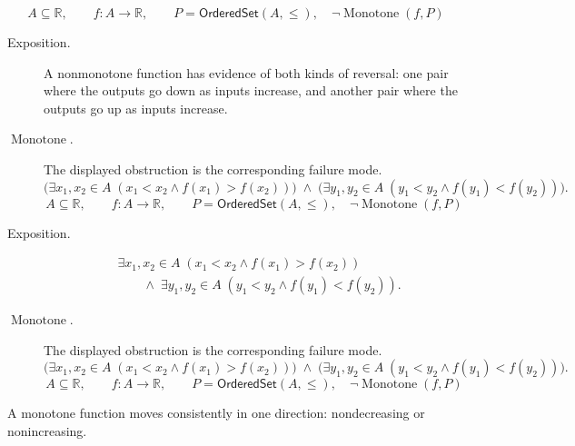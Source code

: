 \begin{remark*}
\[
  A\subseteq\mathbb{R},\qquad f\colon A\to\mathbb{R},\qquad P=\mathsf{OrderedSet}(A,\leq),\quad
  \neg\operatorname{Monotone}(f,P)
\]
\end{remark*}

\begin{remark*}
\begin{description}
  \item[Exposition.]
A nonmonotone function has evidence of both kinds of reversal: one pair
where the outputs go down as inputs increase, and another pair where the
outputs go up as inputs increase.


  \item[\(\operatorname{Monotone}.\)]
  The displayed obstruction is the corresponding failure mode.
  \[
  \bigl(\exists x_1,x_2\in A\;(x_1<x_2\wedge f(x_1)>f(x_2))\bigr)
  \;\wedge\;
  \bigl(\exists y_1,y_2\in A\;(y_1<y_2\wedge f(y_1)<f(y_2))\bigr).
\]
  \[
  A\subseteq\mathbb{R},\qquad f\colon A\to\mathbb{R},\qquad P=\mathsf{OrderedSet}(A,\leq),\quad
  \neg\operatorname{Monotone}(f,P)
\]
\end{description}
\end{remark*}

\begin{remark*}
\begin{description}
  \item[Exposition.]
\[
  \begin{aligned}
  &\exists x_1,x_2\in A\;(x_1<x_2\wedge f(x_1)>f(x_2))\\
  &\qquad\wedge\;
  \exists y_1,y_2\in A\;(y_1<y_2\wedge f(y_1)<f(y_2)).
  \end{aligned}
\]


  \item[\(\operatorname{Monotone}.\)]
  The displayed obstruction is the corresponding failure mode.
  \[
  \bigl(\exists x_1,x_2\in A\;(x_1<x_2\wedge f(x_1)>f(x_2))\bigr)
  \;\wedge\;
  \bigl(\exists y_1,y_2\in A\;(y_1<y_2\wedge f(y_1)<f(y_2))\bigr).
\]
  \[
  A\subseteq\mathbb{R},\qquad f\colon A\to\mathbb{R},\qquad P=\mathsf{OrderedSet}(A,\leq),\quad
  \neg\operatorname{Monotone}(f,P)
\]
\end{description}
\end{remark*}

\begin{remark*}[Interpretation]
A monotone function moves consistently in one direction: nondecreasing or
nonincreasing.
\end{remark*}


